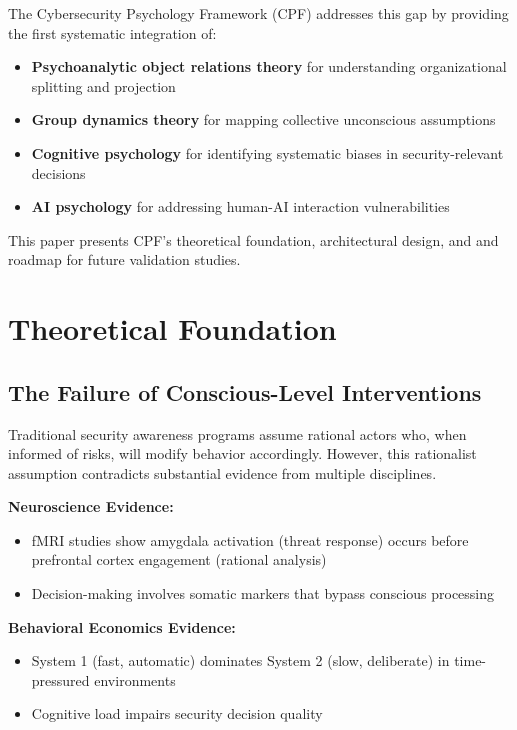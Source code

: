 \documentclass[11pt,a4paper]{article}
\begin{document}
The Cybersecurity Psychology Framework (CPF) addresses this gap by providing the first systematic integration of:
\begin{itemize}
\item \textbf{Psychoanalytic object relations theory} for understanding organizational splitting and projection
\item \textbf{Group dynamics theory} for mapping collective unconscious assumptions
\item \textbf{Cognitive psychology} for identifying systematic biases in security-relevant decisions
\item \textbf{AI psychology} for addressing human-AI interaction vulnerabilities
\end{itemize}

This paper presents CPF's theoretical foundation, architectural design, and and roadmap for future validation studies.

\section{Theoretical Foundation}

\subsection{The Failure of Conscious-Level Interventions}

Traditional security awareness programs assume rational actors who, when informed of risks, will modify behavior accordingly\cite{ajzen1991}. However, this rationalist assumption contradicts substantial evidence from multiple disciplines.

\textbf{Neuroscience Evidence:}
\begin{itemize}
\item fMRI studies show amygdala activation (threat response) occurs before prefrontal cortex engagement (rational analysis)\cite{ledoux2000}
\item Decision-making involves somatic markers that bypass conscious processing\cite{damasio1994}
\end{itemize}

\textbf{Behavioral Economics Evidence:}
\begin{itemize}
\item System 1 (fast, automatic) dominates System 2 (slow, deliberate) in time-pressured environments\cite{kahneman2011}
\item Cognitive load impairs security decision quality\cite{beautement2008}
\end{itemize}
\end{document}
